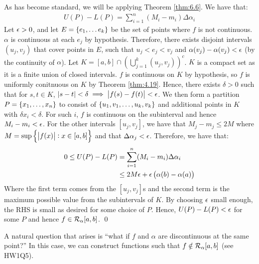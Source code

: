 \begin{nproof}
    As has become standard, we will be applying Theorem \ref{thm:6.6}. We have that:
    \begin{align*}
        U(P) - L(P) = \sum_{i=1}^n (M_i - m_i)\Delta \alpha_i
    \end{align*}
    Let $\epsilon > 0$, and let $E = \set{e_1, \ldots e_k}$ be the set of points where $f$ is not continuous. $\alpha$ is continuous at each $e_j$ by hypothesis. Therefore, there exists disjoint intervals $(u_j, v_j)$ that cover points in $E$, such that $u_j < e_j < v_j$ and $\alpha(v_j) - \alpha(v_j) < \epsilon$ (by the continuity of $\alpha$). Let $K = [a, b] \cap \left(\bigcup_{j=1}^k (u_j, v_j)\right)^c$. $K$ is a compact set as it is a finite union of closed intervals. $f$ is continuous on $K$ by hypothesis, so $f$ is uniformly conitnuous on $K$ by Theorem \ref{thm:4.19}. Hence, there exists $\delta > 0$ such that for $s, t \in K$, $\abs{s - t} < \delta \implies \abs{f(s) - f(t)} < \epsilon$. We then form a partition $P = \set{x_1, \ldots, x_n}$ to consist of $\set{u_1, v_1, \ldots, u_k, v_k}$ and additional points in $K$ with $\delta x_i < \delta$. For such $i$, $f$ is continuous on the subinterval and hence $M_i - m_i < \epsilon$. For the other intervals $[u_j, v_j]$, we have that $M_j - m_j \leq 2M$ where $M = \sup\set{\abs{f(x)}: x \in [a, b]}$ and that $\Delta \alpha_j < \epsilon$. Therefore, we have that:
    \begin{align*}
        0 \leq U(P) - L(P) &= \sum_{i=1}^n (M_i - m_i)\Delta \alpha_i
        \\ &\leq 2M\epsilon + \epsilon\left(\alpha(b) - \alpha(a)\right)
    \end{align*}
    Where the first term comes from the $[u_j, v_j]$s and the second term is the maximum possible value from the subintervals of $K$. By choosing $\epsilon$ small enough, the RHS is small as desired for some choice of $P$. Hence, $U(P) - L(P) < \epsilon$ for some $P$ and hence $f \in \mathcal{R}_\alpha[a, b]$. \qed
\end{nproof}
\noindent A natural question that arises is ``what if $f$ and $\alpha$ are discontinuous at the same point?'' In this case, we can construct functions such that $f \notin \mathcal{R}_\alpha[a, b]$ (see HW1Q5).
